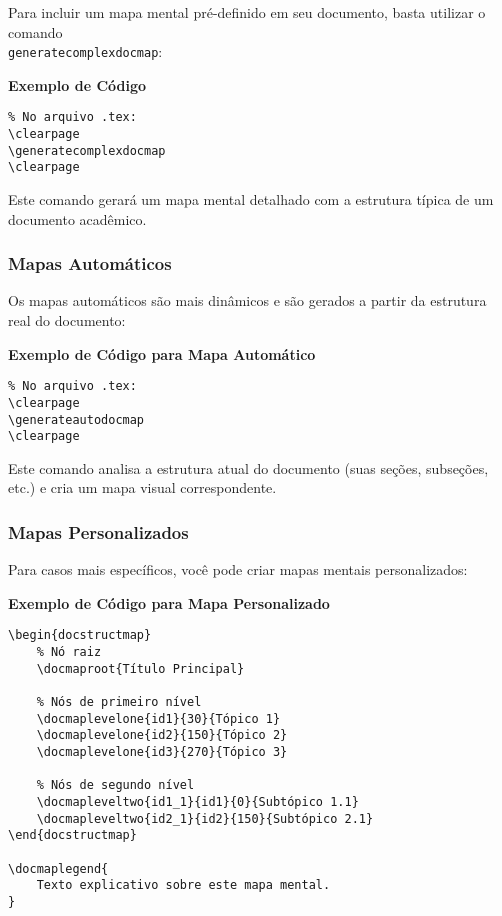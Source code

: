 Para incluir um mapa mental pré-definido em seu documento, basta utilizar o comando \texttt{\\generatecomplexdocmap}:

\begin{spell}
\textbf{Exemplo de Código}

\begin{verbatim}
% No arquivo .tex:
\clearpage
\generatecomplexdocmap
\clearpage
\end{verbatim}

Este comando gerará um mapa mental detalhado com a estrutura típica de um documento acadêmico.
\end{spell}

\subsubsection{Mapas Automáticos}

Os mapas automáticos são mais dinâmicos e são gerados a partir da estrutura real do documento:

\begin{spell}
\textbf{Exemplo de Código para Mapa Automático}

\begin{verbatim}
% No arquivo .tex:
\clearpage
\generateautodocmap
\clearpage
\end{verbatim}

Este comando analisa a estrutura atual do documento (suas seções, subseções, etc.) e cria um mapa visual correspondente.
\end{spell}


\subsubsection{Mapas Personalizados}

Para casos mais específicos, você pode criar mapas mentais personalizados:

\begin{spell}
\textbf{Exemplo de Código para Mapa Personalizado}

\begin{verbatim}
\begin{docstructmap}
    % Nó raiz
    \docmaproot{Título Principal}
    
    % Nós de primeiro nível
    \docmaplevelone{id1}{30}{Tópico 1}
    \docmaplevelone{id2}{150}{Tópico 2}
    \docmaplevelone{id3}{270}{Tópico 3}
    
    % Nós de segundo nível
    \docmapleveltwo{id1_1}{id1}{0}{Subtópico 1.1}
    \docmapleveltwo{id2_1}{id2}{150}{Subtópico 2.1}
\end{docstructmap}

\docmaplegend{
    Texto explicativo sobre este mapa mental.
}
\end{verbatim}
\end{spell}

